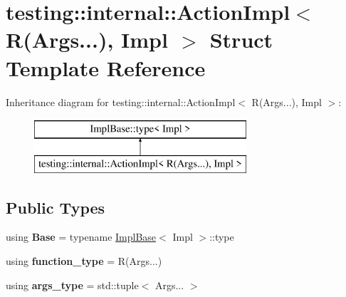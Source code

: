 \hypertarget{structtesting_1_1internal_1_1ActionImpl_3_01R_07Args_8_8_8_08_00_01Impl_01_4}{}\section{testing\+:\+:internal\+:\+:Action\+Impl$<$ R(Args...), Impl $>$ Struct Template Reference}
\label{structtesting_1_1internal_1_1ActionImpl_3_01R_07Args_8_8_8_08_00_01Impl_01_4}
Inheritance diagram for testing\+:\+:internal\+:\+:Action\+Impl$<$ R(Args...), Impl $>$\+:\begin{figure}[H]
\begin{center}
\leavevmode
\includegraphics[height=2.000000cm]{structtesting_1_1internal_1_1ActionImpl_3_01R_07Args_8_8_8_08_00_01Impl_01_4}
\end{center}
\end{figure}
\subsection*{Public Types}
\begin{DoxyCompactItemize}
\item 
\mbox{\label{structtesting_1_1internal_1_1ActionImpl_3_01R_07Args_8_8_8_08_00_01Impl_01_4_a4dededa4ec14ef85f71ca3978e83057e}} 
using {\bfseries Base} = typename \mbox{\hyperlink{structtesting_1_1internal_1_1ImplBase}{Impl\+Base}}$<$ Impl $>$\+::type
\item 
\mbox{\label{structtesting_1_1internal_1_1ActionImpl_3_01R_07Args_8_8_8_08_00_01Impl_01_4_adcf7b7f64c8f966f5cc101176b6a35f9}} 
using {\bfseries function\+\_\+type} = R(Args...)
\item 
\mbox{\label{structtesting_1_1internal_1_1ActionImpl_3_01R_07Args_8_8_8_08_00_01Impl_01_4_a056940cbe95b0ef5c0a10e2a4c654b69}} 
using {\bfseries args\+\_\+type} = std\+::tuple$<$ Args... $>$
\end{DoxyCompactItemize}
